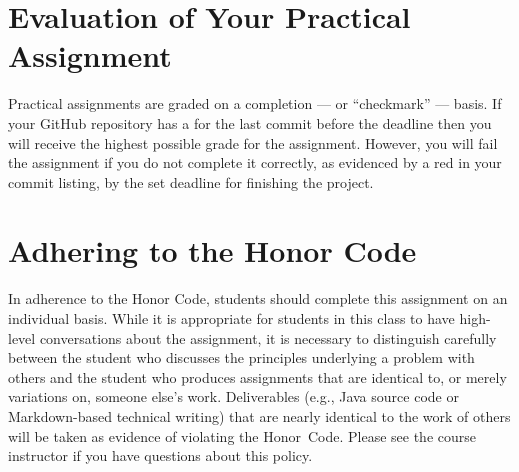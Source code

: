 \documentclass[11pt]{article}
\newcommand{\checkmark}{\ding{51}}
\newcommand{\naughtmark}{\ding{55}}
\begin{document}
\section*{Evaluation of Your Practical Assignment}

Practical assignments are graded on a completion --- or ``checkmark'' --- basis.
If your GitHub repository has a \checkmark{} for the last commit before the
deadline then you will receive the highest possible grade for the assignment.
However, you will fail the assignment if you do not complete it correctly, as
evidenced by a red \naughtmark{} in your commit listing, by the set deadline for
finishing the project.

\section*{Adhering to the Honor Code}

In adherence to the Honor Code, students should complete this assignment on an
individual basis. While it is appropriate for students in this class to have
high-level conversations about the assignment, it is necessary to distinguish
carefully between the student who discusses the principles underlying a problem
with others and the student who produces assignments that are identical to, or
merely variations on, someone else's work. Deliverables (e.g., Java source code
or Markdown-based technical writing) that are nearly identical to the work of
others will be taken as evidence of violating the \mbox{Honor Code}. Please see
the course instructor if you have questions about this policy.
\end{document}
